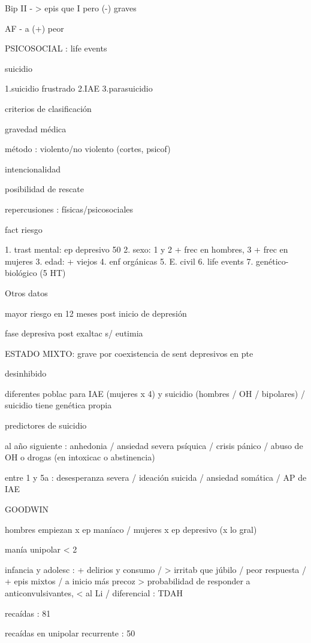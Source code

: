 \documentclass{scrbook}
\begin{document}
Bip II - > epis que I pero (-) graves

AF - a (+) peor

PSICOSOCIAL : life events

suicidio

1.suicidio frustrado
2.IAE
3.parasuicidio

criterios de clasificación

gravedad médica

método : violento/no violento (cortes, psicof)

intencionalidad

posibilidad de rescate

repercusiones : físicas/psicosociales

fact riesgo

1. trast mental: ep depresivo 50%
2. sexo: 1 y 2 + frec en hombres, 3 + frec en mujeres
3. edad: + viejos
4. enf orgánicas
5. E. civil
6. life events
7. genético-biológico (5 HT)

Otros datos

mayor riesgo en 12 meses post inicio de depresión

fase depresiva post exaltac s/ eutimia

ESTADO MIXTO: grave por coexistencia de sent depresivos en pte

desinhibido

diferentes poblac para IAE (mujeres x 4) y suicidio (hombres / OH / bipolares) / suicidio tiene genética propia

predictores de suicidio

al año siguiente : anhedonia / ansiedad severa psíquica / crisis pánico / abuso de OH o drogas (en intoxicac o abstinencia)

entre 1 y 5a : desesperanza severa / ideación suicida / ansiedad somática / AP de IAE

GOODWIN

hombres empiezan x ep maníaco / mujeres x ep depresivo (x lo gral)

manía unipolar < 2%

infancia y adolesc : + delirios y consumo / > irritab que júbilo / peor respuesta / + epis mixtos / a inicio más precoz > probabilidad de responder a anticonvulsivantes, < al Li / diferencial : TDAH

recaídas : 81%

recaídas en unipolar recurrente : 50%
\end{document}
